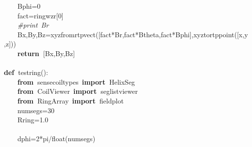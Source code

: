 \documentclass{article}
\newcommand{\hlstd}[1]{\textcolor[rgb]{0,0,0}{#1}}
\newcommand{\hlnum}[1]{\textcolor[rgb]{0.16,0.16,1}{#1}}
\newcommand{\hlslc}[1]{\textcolor[rgb]{0.51,0.51,0.51}{\it{#1}}}
\newcommand{\hlsym}[1]{\textcolor[rgb]{0,0,0}{#1}}
\newcommand{\hlkwa}[1]{\textcolor[rgb]{0,0,0}{\bf{#1}}}
\newcommand{\hlkwb}[1]{\textcolor[rgb]{0.51,0,0}{#1}}
\newcommand{\hlkwd}[1]{\textcolor[rgb]{0,0,0.51}{#1}}
\begin{document}
\hlstd{}\hlstd{\ \ \ \ }\hlstd{Bphi}\hlsym{=}\hlstd{}\hlnum{0}\hspace*{\fill}\\
\hlstd{}\hlstd{\ \ \ \ }\hlstd{fact}\hlsym{=}\hlstd{ring\textunderscore wzr}\hlsym{{[}}\hlstd{}\hlnum{0}\hlstd{}\hlsym{{]}}\hspace*{\fill}\\
\hlstd{}\hlstd{\ \ \ \ }\hlstd{}\hlslc{\#print\ Br}\hspace*{\fill}\\
\hlstd{}\hlstd{\ \ \ \ }\hlstd{Bx}\hlsym{,}\hlstd{By}\hlsym{,}\hlstd{Bz}\hlsym{=}\hlstd{}\hlkwd{xyz\textunderscore from\textunderscore rtp\textunderscore vect}\hlstd{}\hlsym{({[}}\hlstd{fact}\hlsym{{*}}\hlstd{Br}\hlsym{,}\hlstd{fact}\hlsym{{*}}\hlstd{Btheta}\hlsym{,}\hlstd{fact}\hlsym{{*}}\hlstd{Bphi}\hlsym{{]},}\hlstd{}\hlkwd{xyz\textunderscore to\textunderscore rtp\textunderscore point}\hlstd{}\hlsym{({[}}\hlstd{x}\hlsym{,}\hlstd{y}\hlsym{,}\hlstd{z}\hlsym{{]}))}\hspace*{\fill}\\
\hlstd{}\hlstd{\ \ \ \ }\hlstd{}\hlkwa{return\ }\hlstd{}\hlsym{{[}}\hlstd{Bx}\hlsym{,}\hlstd{By}\hlsym{,}\hlstd{Bz}\hlsym{{]}}\hspace*{\fill}\\
\hlstd{}\hspace*{\fill}\\
\hlkwa{def\ }\hlstd{}\hlkwd{testring}\hlstd{}\hlsym{():}\hspace*{\fill}\\
\hlstd{}\hlstd{\ \ \ \ }\hlstd{}\hlkwa{from\ }\hlstd{sensecoiltypes\ }\hlkwa{import\ }\hlstd{HelixSeg\hspace*{\fill}\\
}\hlstd{\ \ \ \ }\hlstd{}\hlkwa{from\ }\hlstd{CoilViewer\ }\hlkwa{import\ }\hlstd{seglistviewer\hspace*{\fill}\\
}\hlstd{\ \ \ \ }\hlstd{}\hlkwa{from\ }\hlstd{RingArray\ }\hlkwa{import\ }\hlstd{fieldplot\hspace*{\fill}\\
}\hlstd{\ \ \ \ }\hlstd{numsegs}\hlsym{=}\hlstd{}\hlnum{30}\hspace*{\fill}\\
\hlstd{}\hlstd{\ \ \ \ }\hlstd{Rring}\hlsym{=}\hlstd{}\hlnum{1.0}\hspace*{\fill}\\
\hlstd{\hspace*{\fill}\\
}\hlstd{\ \ \ \ }\hlstd{dphi}\hlsym{=}\hlstd{}\hlnum{2}\hlstd{}\hlsym{{*}}\hlstd{pi}\hlsym{/}\hlstd{}\hlkwb{float}\hlstd{}\hlsym{(}\hlstd{numsegs}\hlsym{)}\hspace*{\fill}\\
\end{document}

